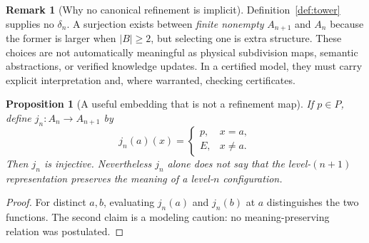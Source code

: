 \documentclass[11pt]{article}
\newtheorem{proposition}[theorem]{Proposition}
\theoremstyle{definition}
\newtheorem{remark}[theorem]{Remark}
\begin{document}
\begin{remark}[Why no canonical refinement is implicit]
Definition~\ref{def:tower} supplies no $\delta_n$. A surjection exists between \emph{finite nonempty} $A_{n+1}$ and $A_n$ because the former is larger when $|B|\ge2$, but selecting one is extra structure. These choices are not automatically meaningful as physical subdivision maps, semantic abstractions, or verified knowledge updates. In a certified model, they must carry explicit interpretation and, where warranted, checking certificates.
\end{remark}
\begin{proposition}[A useful embedding that is not a refinement map]
If $p\in P$, define $j_n:A_n\to A_{n+1}$ by
\[
j_n(a)(x)=\begin{cases}p,&x=a,\\E,&x\ne a.\end{cases}
\]
Then $j_n$ is injective. Nevertheless $j_n$ alone does not say that the level-$(n+1)$ representation preserves the meaning of a level-$n$ configuration.
\end{proposition}
\begin{proof}For distinct $a,b$, evaluating $j_n(a)$ and $j_n(b)$ at $a$ distinguishes the two functions. The second claim is a modeling caution: no meaning-preserving relation was postulated.\end{proof}
\end{document}
